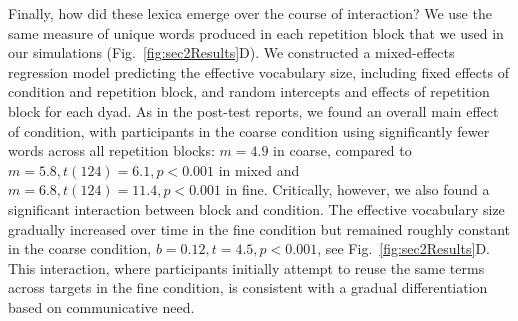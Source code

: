 Finally, how did these lexica emerge over the course of interaction? 
We use the same measure of unique words produced in each repetition block that we used in our simulations (Fig.~\ref{fig:sec2Results}D). 
We constructed a mixed-effects regression model predicting the effective vocabulary size, including fixed effects of condition and repetition block, and random intercepts and effects of repetition block for each dyad. 
As in the post-test reports, we found an overall main effect of condition, with participants in the coarse condition using significantly fewer words across all repetition blocks: $m = 4.9$ in coarse, compared to $m=5.8, t(124)=6.1, p <0.001$ in mixed and $m=6.8, t(124) =11.4, p < 0.001$ in fine.
Critically, however, we also found a significant interaction between block and condition. 
The effective vocabulary size gradually increased over time in the fine condition but remained roughly constant in the coarse condition, $b = 0.12, t = 4.5, p < 0.001$, see Fig.~\ref{fig:sec2Results}D.
This interaction, where participants initially attempt to reuse the same terms across targets in the fine condition, is consistent with a gradual differentiation based on communicative need.



%

